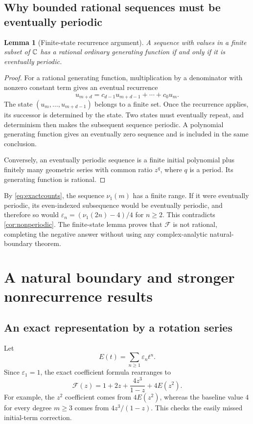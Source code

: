 \documentclass[11pt]{article}
\newtheorem{lemma}[theorem]{Lemma}
\theoremstyle{definition}\newtheorem{definition}[theorem]{Definition}
\theoremstyle{remark}\newtheorem{remark}[theorem]{Remark}
\newcommand{\eps}{\varepsilon}
\newcommand{\nuone}{\nu_1}
\newcommand{\F}{\mathcal F}
\begin{document}
\subsection{Why bounded rational sequences must be eventually periodic}

\begin{lemma}[Finite-state recurrence argument]\label{lem:boundedrational}
A sequence with values in a finite subset of $\mathbb C$ has a rational ordinary generating function if and only if it is eventually periodic.
\end{lemma}
\begin{proof}
For a rational generating function, multiplication by a denominator with nonzero constant term gives an eventual recurrence
\[
 u_{m+d}=c_{d-1}u_{m+d-1}+\cdots+c_0u_m.
\]
The state $(u_m,\ldots,u_{m+d-1})$ belongs to a finite set. Once the recurrence applies, its successor is determined by the state. Two states must eventually repeat, and determinism then makes the subsequent sequence periodic. A polynomial generating function gives an eventually zero sequence and is included in the same conclusion.

Conversely, an eventually periodic sequence is a finite initial polynomial plus finitely many geometric series with common ratio $z^q$, where $q$ is a period. Its generating function is rational.
\end{proof}

By \eqref{eq:exactcounts}, the sequence $\nuone(m)$ has a finite range. If it were eventually periodic, its even-indexed subsequence would be eventually periodic, and therefore so would $\eps_n=(\nuone(2n)-4)/4$ for $n\geq2$. This contradicts \cref{cor:nonperiodic}. The finite-state lemma proves that $\F$ is not rational, completing the negative answer without using any complex-analytic natural-boundary theorem.

\section{A natural boundary and stronger nonrecurrence results}

\subsection{An exact representation by a rotation series}

Let
\begin{equation}\label{eq:Edef}
 E(t)=\sum_{n\geq1}\eps_nt^n.
\end{equation}
Since $\eps_1=1$, the exact coefficient formula rearranges to
\begin{equation}\label{eq:Frotation}
 \boxed{\displaystyle
 \F(z)=1+2z+\frac{4z^3}{1-z}+4E(z^2).}
\end{equation}
For example, the $z^2$ coefficient comes from $4E(z^2)$, whereas the baseline value $4$ for every degree $m\geq3$ comes from $4z^3/(1-z)$. This checks the easily missed initial-term correction.
\end{document}
